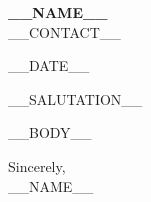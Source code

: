 \documentclass[11pt,letterpaper]{article}
\begin{document}
\begin{center}
    \textbf{\Huge \scshape __NAME__} \\ \vspace{2pt}
    \small __CONTACT__
\end{center}

\vspace{1.2em}

__DATE__

\vspace{0.6em}

__SALUTATION__

__BODY__

\vspace{0.6em}

Sincerely, \\
__NAME__
\end{document}

